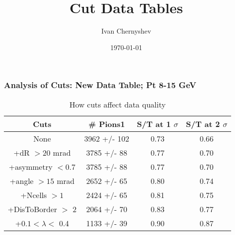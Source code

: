 \documentclass{beamer}
\title{Cut Data Tables}
\author{Ivan Chernyshev}
\date{\today}
\begin{document}

\frame
{
\frametitle{Analysis of Cuts: New Data Table;  Pt 8-15 GeV}
\begin{table}
\caption{How cuts affect data quality}
\centering
\begin{tabular}{c c c c}
\hline\hline
Cuts & \# Pions1 & S/T at 1 $\sigma$ &  S/T at 2 $\sigma$ \\ [0.5ex] %
\hline
None & 3962 +/- 102 & 0.73 & 0.66 \\
+dR $> 20$ mrad & 3785 +/- 88 & 0.77 & 0.70 \\
+asymmetry $< 0.7$ & 3785 +/- 88 & 0.77 & 0.70 \\
+angle $> 15$ mrad & 2652 +/- 65 & 0.80 & 0.74 \\
+Ncells $> 1$& 2424 +/- 65 & 0.81 & 0.75\\
+DisToBorder $>$ 2 & 2064 +/- 70 & 0.83 & 0.77 \\
+$0.1 < \lambda <$ 0.4 & 1133 +/- 39 & 0.90 & 0.87 \\ [1ex]
\hline
\end{tabular}
\label{table:nonlin}
\end{table}
}
\end{document}
